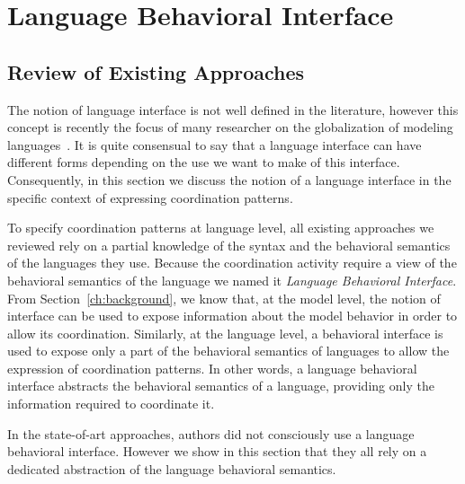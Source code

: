 \section{Language Behavioral Interface}
\subsection{Review of Existing Approaches}

The notion of language interface is not well defined in the literature, however this concept is recently the focus of many researcher on the globalization of modeling languages~\cite{GML_ch1, GML_ch3, GML_ch4, TdegeuleSLE}. It is quite consensual to say that a language interface can have different forms depending on the use we want to make of this interface. Consequently, in this section we discuss the notion of a language interface in the specific context of expressing coordination patterns. 

To specify coordination patterns at language level, all existing approaches we reviewed rely on a partial knowledge of the syntax and the behavioral semantics of the languages they use. Because the coordination activity require a view of the behavioral semantics of the language we named it \emph{Language Behavioral Interface}. From Section~\ref{ch:background}, we know that, at the model level, the notion of interface can be used to expose information about the model behavior in order to allow its coordination. Similarly, at the language level, a behavioral interface is used to expose only a part of the behavioral semantics of languages to allow the expression of coordination patterns. In other words, a language behavioral interface abstracts the behavioral semantics of a language, providing only the information required to coordinate it. 


In the state-of-art approaches, authors did not consciously use a language behavioral interface. However we show in this section that they all rely on a dedicated abstraction of the language behavioral semantics. 

